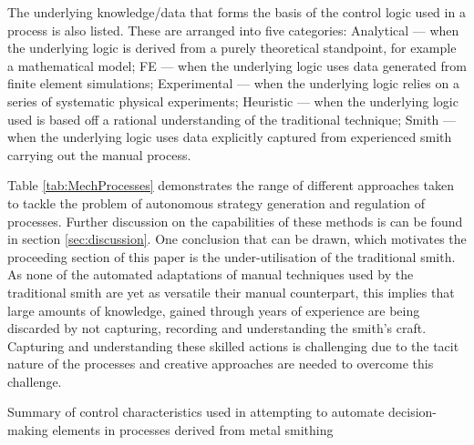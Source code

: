 The underlying knowledge/data that forms the basis of the control logic used in a process is also listed. These are arranged into five categories: Analytical --- when the underlying logic is derived from a purely theoretical standpoint, for example a mathematical model; FE --- when the underlying logic uses data generated from finite element simulations; Experimental --- when the underlying logic relies on a series of systematic physical experiments; Heuristic --- when the underlying logic used is based off a rational understanding of the traditional technique;  Smith --- when the underlying logic uses data explicitly captured from experienced smith carrying out the manual process.

Table \ref{tab:MechProcesses} demonstrates the range of different approaches taken to tackle the problem of autonomous strategy generation and regulation of processes. Further discussion on the capabilities of these methods is can be found in section \ref{sec:discussion}. One conclusion that can be drawn, which motivates the proceeding section of this paper is the under-utilisation  of the traditional smith. As none of the automated adaptations of manual techniques used by the traditional smith are yet as versatile their manual counterpart, this implies that large amounts of knowledge, gained through years of experience are being discarded by not capturing, recording and understanding the smith’s craft. Capturing and understanding these skilled actions is challenging due to the tacit nature of the processes and creative approaches are needed to overcome this challenge.


\begin{landscape}
\renewcommand{\arraystretch}{1.2} 
\begin{table}[h] 
    \centering
    \resizebox{\linewidth}{!}{
        
        }
    \caption{Summary of control characteristics used in attempting to automate decision-making elements  in processes derived from metal smithing}
    \label{tab:MechProcesses}
\end{table}
\end{landscape}



